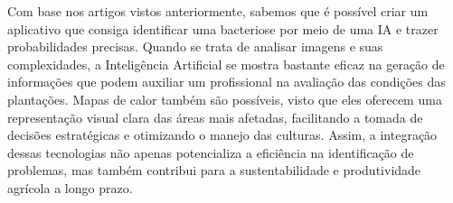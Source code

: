 Com base nos artigos vistos anteriormente, sabemos que é possível criar um aplicativo que consiga identificar uma bacteriose por meio de uma IA e trazer probabilidades precisas. Quando se trata de analisar imagens e suas complexidades, a Inteligência Artificial se mostra bastante eficaz na geração de informações que podem auxiliar um profissional na avaliação das condições das plantações. Mapas de calor também são possíveis, visto que eles oferecem uma representação visual clara das áreas mais afetadas, facilitando a tomada de decisões estratégicas e otimizando o manejo das culturas. Assim, a integração dessas tecnologias não apenas potencializa a eficiência na identificação de problemas, mas também contribui para a sustentabilidade e produtividade agrícola a longo prazo.
